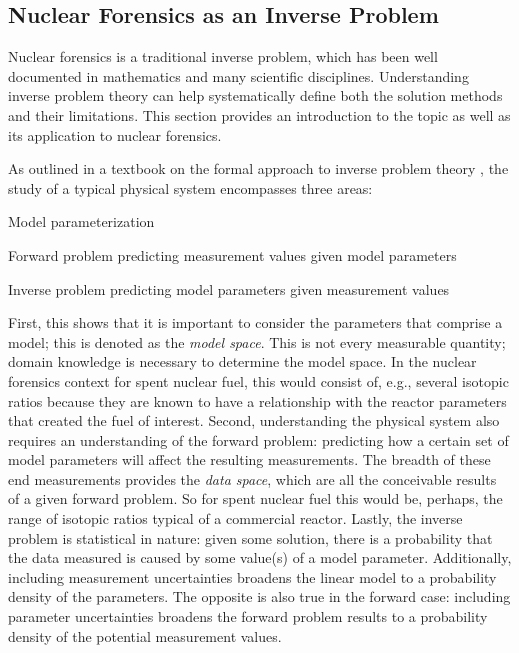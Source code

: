 \subsection{Nuclear Forensics as an Inverse Problem}
\label{sec:inverse}

Nuclear forensics is a traditional inverse problem, which has been well
documented in mathematics and many scientific disciplines.  Understanding
inverse problem theory can help systematically define both the solution methods
and their limitations. This section provides an introduction to the topic as
well as its application to nuclear forensics.

As outlined in a textbook on the formal approach to inverse problem theory
\cite{inverse_theory}, the study of a typical physical system encompasses three
areas:
\begin{hanglist}[itemsep=0pt, parsep=0pt, partopsep=0pt, topsep=0pt, leftmargin=15pt]
    \item Model parameterization 
    \item Forward problem predicting measurement values given model parameters 
    \item Inverse problem predicting model parameters given measurement values 
\end{hanglist}
First, this shows that it is important to consider the parameters that comprise
a model; this is denoted as the \textit{model space}. This is not every
measurable quantity; domain knowledge is necessary to determine the model
space. In the nuclear forensics context for spent nuclear fuel, this would
consist of, e.g., several isotopic ratios because they are known to have a
relationship with the reactor parameters that created the fuel of interest.
Second, understanding the physical system also requires an understanding of the
forward problem: predicting how a certain set of model parameters will affect
the resulting measurements. The breadth of these end measurements provides the
\textit{data space}, which are all the conceivable results of a given forward
problem. So for spent nuclear fuel this would be, perhaps, the range of
isotopic ratios typical of a commercial reactor. Lastly, the inverse problem is
statistical in nature: given some solution, there is a probability that the
data measured is caused by some value(s) of a model parameter. Additionally,
including measurement uncertainties broadens the linear model to a probability
density of the parameters. The opposite is also true in the forward case:
including parameter uncertainties broadens the forward problem results to a
probability density of the potential measurement values.

